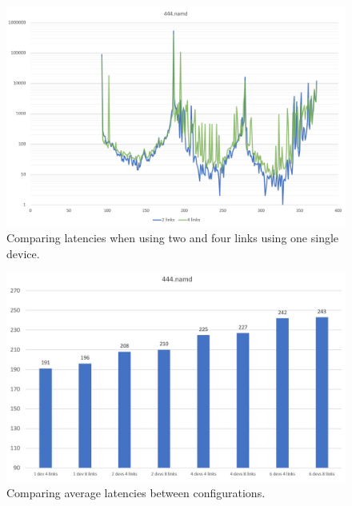 \begin{figure}[!ht]
    \centering
    \includegraphics[width=1.0\linewidth]{figure/444-2_4-8.jpg}
    \caption{Comparing latencies when using two and four links using one single device.}
    \label{Memory-access-444-links-compare}
\end{figure}
\begin{figure}[!ht]
    \centering
    \includegraphics[width=1.0\linewidth]{figure/444_averages.jpg}
    \caption{Comparing average latencies between configurations.}
    \label{Memory-access-444-average-latency}
\end{figure}

